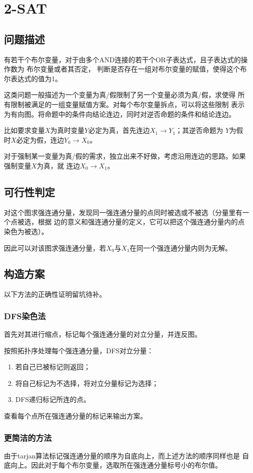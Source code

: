 \section{2-SAT}
\subsection{问题描述}
有若干个布尔变量，对于由多个AND连接的若干个OR子表达式，且子表达式的操作数为
布尔变量或者其否定，
判断是否存在一组对布尔变量的赋值，使得这个布尔表达式的值为1。

这类问题一般描述为一个变量为真/假限制了另一个变量必须为真/假，求使得
所有限制被满足的一组变量赋值方案。对每个布尔变量拆点，可以将这些限制
表示为有向图。将命题中的条件向结论连边，同时对逆否命题的条件和结论连边。

比如要求变量$X$为真时变量$Y$必定为真，首先连边$X_1\rightarrow Y_1$；其逆否命题为
$Y$为假时$X$必定为假，连边$Y_0\rightarrow X_0$。

对于强制某一变量为真/假的需求，独立出来不好做，考虑沿用连边的思路。如果强制变量$X$为真，就
连边$X_0\rightarrow X_1$。
\subsection{可行性判定}
对这个图求强连通分量，发现同一强连通分量的点同时被选或不被选（分量里有一个点被选，根据
边的意义和强连通分量的定义，它可以把这个强连通分量内的点染色为被选）。

因此可以对该图求强连通分量，若$X_0$与$X_1$在同一个强连通分量内则为无解。
\subsection{构造方案}
以下方法的正确性证明留坑待补。
\subsubsection{DFS染色法}
首先对其进行缩点，标记每个强连通分量的对立分量，并连反图。

按照拓扑序处理每个强连通分量，DFS对立分量：
\begin{enumerate}
    \item 若自己已被标记则返回；
    \item 将自己标记为不选择，将对立分量标记为选择；
    \item DFS递归标记所连的点。
\end{enumerate}
查看每个点所在强连通分量的标记来输出方案。
\subsubsection{更简洁的方法}
由于tarjan算法标记强连通分量的顺序为自底向上，而上述方法的顺序同样也是
自底向上。因此对于每个布尔变量，选取所在强连通分量标号小的布尔值。

